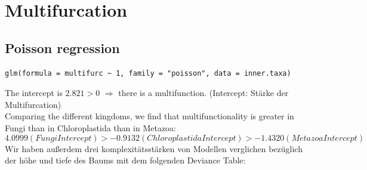     \section{Multifurcation}
      
       \subsection{Poisson regression}
      
        \begin{lstlisting}[gobble=8]
          glm(formula = multifurc ~ 1, family = "poisson", data = inner.taxa)
        \end{lstlisting}
        The intercept is $2.821 > 0$ $\Rightarrow$ there is a multifunction.
        (Intercept: Stärke der Multifurcation) \\
        Comparing the different kingdoms, we find that multifunctionality is greater in Fungi than in 
        Chloroplastida than in Metazoa:
        $$4.0999 (Fungi Intercept) > -0.9132 (Chloroplastida Intercept) > -1.4320 (Metazoa Intercept)$$
        Wir haben außerdem drei komplexitätsstärken von Modellen verglichen bezüglich der höhe und tiefe 
          des Baums mit dem folgenden Deviance Table:
          
